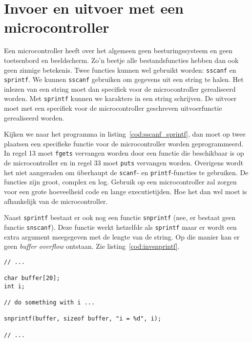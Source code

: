 \advanced
\section{Invoer en uitvoer met een microcontroller}
\label{sec:invoeruitvoermcu}
Een microcontroller heeft over het algemeen geen besturingssysteem en geen toetsenbord en beeldscherm. Zo'n beetje alle bestandsfuncties hebben dan ook geen zinnige betekenis. Twee functies kunnen wel gebruikt worden: \texttt{sscanf} en \texttt{sprintf}. We kunnen \texttt{sscanf} gebruiken om gegevens uit een string te halen. Het inlezen van een string moet dan specifiek voor de microcontroller gerealiseerd worden. Met \texttt{sprintf} kunnen we karakters in een string schrijven. De uitvoer moet met een specifiek voor de microcontroller geschreven uitvoerfunctie gerealiseerd worden.

Kijken we naar het programma in listing~\ref{cod:sscanf_sprintf}, dan moet op twee plaatsen een specifieke functie voor de microcontroller worden geprogrammeerd. In regel 13 moet \texttt{fgets} vervangen worden door een functie die beschikbaar is op de microcontroller en in regel 33 moet \texttt{puts} vervangen worden. Overigens wordt het niet aangeraden om überhaupt de \texttt{scanf}- en \texttt{printf}-functies te gebruiken. De functies zijn groot, complex en log. Gebruik op een microcontroller zal zorgen voor een grote  hoeveelheid code en lange executietijden. Hoe het dan wel moet is afhankelijk van de microcontroller.

Naast \texttt{sprintf} bestaat er ook nog een functie \texttt{snprintf} (nee, er bestaat geen functie \texttt{snscanf}). Deze functie werkt hetzelfde als \texttt{sprintf} maar er wordt een extra argument meegegeven met de lengte van de string. Op die manier kan er geen \textsl{buffer overflow} ontstaan. Zie listing~\ref{cod:invsnprintf}.

\begin{lstlisting}[caption=Gebruik van \texttt{snprintf} bij het afdrukken naar een string.,label=cod:invsnprintf]
// ...

char buffer[20];
int i;

// do something with i ...

snprintf(buffer, sizeof buffer, "i = %d", i);

// ...
\end{lstlisting}

\basic


